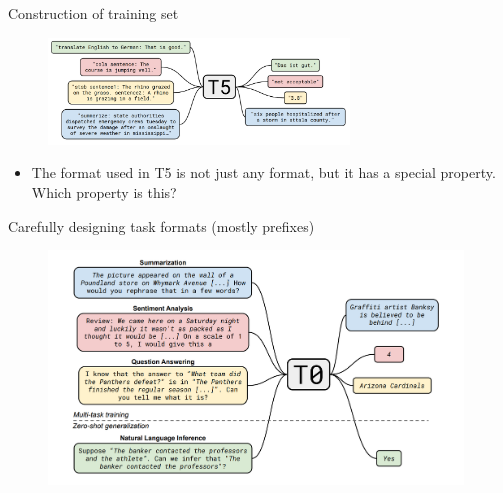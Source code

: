 \begin{frame}{Construction of training set}

\vfill
	
	\begin{figure}
		\centering
		\includegraphics[width = 8cm]{figure/62-t5.png}\\ 
	\end{figure}

\pause

\begin{itemize}
    \item \ques The format used in T5 is not just any
    format, but it has a special property. Which property is this?



\end{itemize}

\vfill

\end{frame}





\begin{frame}{Carefully designing task formats (mostly prefixes)}

\vfill
	
	\begin{figure}
		\centering
		\includegraphics[width = 11cm]{figure/81-t0.png}\\ 
	\end{figure}

\vfill

\end{frame}

